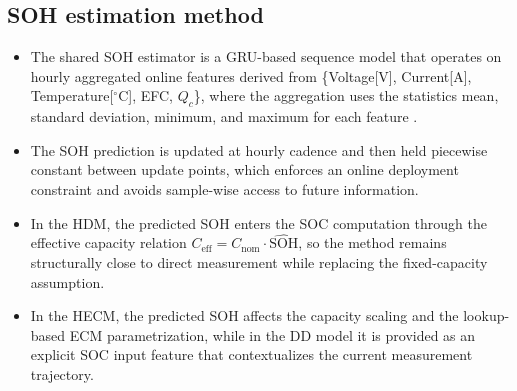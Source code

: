 \documentclass[review,nopreprintline]{elsarticle}
\begin{document}
\subsection{SOH estimation method}
\begin{itemize}[leftmargin=*]
    \item The shared SOH estimator is a GRU-based sequence model that operates on hourly aggregated online features derived from \{Voltage[V], Current[A], Temperature[$^\circ$C], EFC, $Q_c$\}, where the aggregation uses the statistics mean, standard deviation, minimum, and maximum for each feature \cite{Embedded_AI_SOH_badData,gouEnsembleLearningBasedDataDriven2021,liOnlineCapacityEstimation2021,rzepkaNeuralNetworkArchitecture2023a}.
    \item The SOH prediction is updated at hourly cadence and then held piecewise constant between update points, which enforces an online deployment constraint and avoids sample-wise access to future information.
    \item In the HDM, the predicted SOH enters the SOC computation through the effective capacity relation $C_{\mathrm{eff}} = C_{\mathrm{nom}} \cdot \widehat{\mathrm{SOH}}$, so the method remains structurally close to direct measurement while replacing the fixed-capacity assumption.
    \item In the HECM, the predicted SOH affects the capacity scaling and the lookup-based ECM parametrization, while in the DD model it is provided as an explicit SOC input feature that contextualizes the current measurement trajectory.
\end{itemize}
\end{document}

